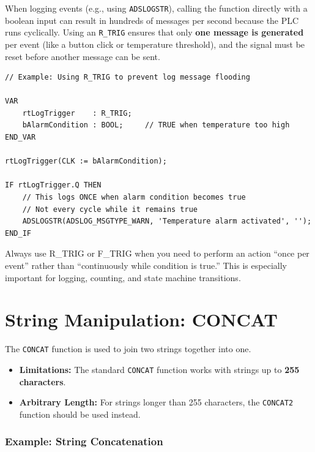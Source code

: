\documentclass[11pt,a4paper]{article}
\begin{document}
When logging events (e.g., using \texttt{ADSLOGSTR}), calling the function directly with a boolean input can result in hundreds of messages per second because the PLC runs cyclically. Using an \texttt{R\_TRIG} ensures that only \textbf{one message is generated} per event (like a button click or temperature threshold), and the signal must be reset before another message can be sent.

\begin{lstlisting}
// Example: Using R_TRIG to prevent log message flooding

VAR
    rtLogTrigger    : R_TRIG;
    bAlarmCondition : BOOL;     // TRUE when temperature too high
END_VAR

rtLogTrigger(CLK := bAlarmCondition);

IF rtLogTrigger.Q THEN
    // This logs ONCE when alarm condition becomes true
    // Not every cycle while it remains true
    ADSLOGSTR(ADSLOG_MSGTYPE_WARN, 'Temperature alarm activated', '');
END_IF
\end{lstlisting}

\begin{tipbox}
Always use R\_TRIG or F\_TRIG when you need to perform an action ``once per event'' rather than ``continuously while condition is true.'' This is especially important for logging, counting, and state machine transitions.
\end{tipbox}

\section{String Manipulation: CONCAT}

The \texttt{CONCAT} function is used to join two strings together into one.

\begin{itemize}[leftmargin=*]
    \item \textbf{Limitations:} The standard \texttt{CONCAT} function works with strings up to \textbf{255 characters}.
    \item \textbf{Arbitrary Length:} For strings longer than 255 characters, the \texttt{CONCAT2} function should be used instead.
\end{itemize}

\subsubsection*{Example: String Concatenation}
\end{document}
